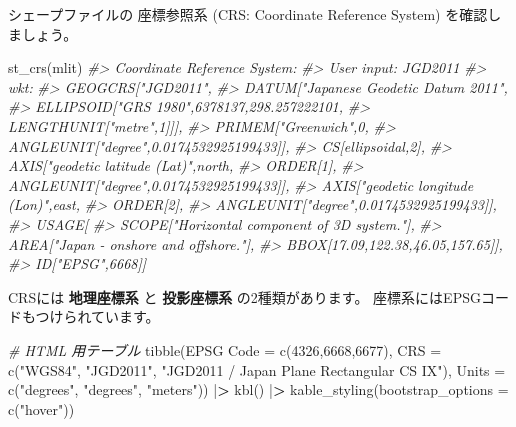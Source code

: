 \documentclass[
]{book}
\newenvironment{Shaded}{\begin{snugshade}}{\end{snugshade}}
\newcommand{\AttributeTok}[1]{\textcolor[rgb]{0.77,0.63,0.00}{#1}}
\newcommand{\CommentTok}[1]{\textcolor[rgb]{0.56,0.35,0.01}{\textit{#1}}}
\newcommand{\DecValTok}[1]{\textcolor[rgb]{0.00,0.00,0.81}{#1}}
\newcommand{\ErrorTok}[1]{\textcolor[rgb]{0.64,0.00,0.00}{\textbf{#1}}}
\newcommand{\FunctionTok}[1]{\textcolor[rgb]{0.00,0.00,0.00}{#1}}
\newcommand{\NormalTok}[1]{#1}
\newcommand{\OtherTok}[1]{\textcolor[rgb]{0.56,0.35,0.01}{#1}}
\newcommand{\SpecialCharTok}[1]{\textcolor[rgb]{0.00,0.00,0.00}{#1}}
\newcommand{\StringTok}[1]{\textcolor[rgb]{0.31,0.60,0.02}{#1}}
\theoremstyle{definition}
\theoremstyle{definition}
\theoremstyle{definition}
\theoremstyle{definition}
\theoremstyle{remark}
\begin{document}
シェープファイルの 座標参照系 (CRS: Coordinate Reference System) を確認しましょう。

\begin{Shaded}
\begin{Highlighting}[]
\FunctionTok{st\_crs}\NormalTok{(mlit)}
\CommentTok{\#\textgreater{} Coordinate Reference System:}
\CommentTok{\#\textgreater{}   User input: JGD2011 }
\CommentTok{\#\textgreater{}   wkt:}
\CommentTok{\#\textgreater{} GEOGCRS["JGD2011",}
\CommentTok{\#\textgreater{}     DATUM["Japanese Geodetic Datum 2011",}
\CommentTok{\#\textgreater{}         ELLIPSOID["GRS 1980",6378137,298.257222101,}
\CommentTok{\#\textgreater{}             LENGTHUNIT["metre",1]]],}
\CommentTok{\#\textgreater{}     PRIMEM["Greenwich",0,}
\CommentTok{\#\textgreater{}         ANGLEUNIT["degree",0.0174532925199433]],}
\CommentTok{\#\textgreater{}     CS[ellipsoidal,2],}
\CommentTok{\#\textgreater{}         AXIS["geodetic latitude (Lat)",north,}
\CommentTok{\#\textgreater{}             ORDER[1],}
\CommentTok{\#\textgreater{}             ANGLEUNIT["degree",0.0174532925199433]],}
\CommentTok{\#\textgreater{}         AXIS["geodetic longitude (Lon)",east,}
\CommentTok{\#\textgreater{}             ORDER[2],}
\CommentTok{\#\textgreater{}             ANGLEUNIT["degree",0.0174532925199433]],}
\CommentTok{\#\textgreater{}     USAGE[}
\CommentTok{\#\textgreater{}         SCOPE["Horizontal component of 3D system."],}
\CommentTok{\#\textgreater{}         AREA["Japan {-} onshore and offshore."],}
\CommentTok{\#\textgreater{}         BBOX[17.09,122.38,46.05,157.65]],}
\CommentTok{\#\textgreater{}     ID["EPSG",6668]]}
\end{Highlighting}
\end{Shaded}

CRSには \textbf{地理座標系} と \textbf{投影座標系} の2種類があります。
座標系にはEPSGコードもつけられています。

\begin{Shaded}
\begin{Highlighting}[]
\CommentTok{\# HTML 用テーブル}
\FunctionTok{tibble}\NormalTok{(}\StringTok{\textasciigrave{}}\AttributeTok{EPSG Code}\StringTok{\textasciigrave{}} \OtherTok{=} \FunctionTok{c}\NormalTok{(}\DecValTok{4326}\NormalTok{,}\DecValTok{6668}\NormalTok{,}\DecValTok{6677}\NormalTok{),}
       \StringTok{\textasciigrave{}}\AttributeTok{CRS}\StringTok{\textasciigrave{}} \OtherTok{=} \FunctionTok{c}\NormalTok{(}\StringTok{"WGS84"}\NormalTok{, }\StringTok{"JGD2011"}\NormalTok{, }\StringTok{"JGD2011 / Japan Plane Rectangular CS IX"}\NormalTok{),}
       \StringTok{\textasciigrave{}}\AttributeTok{Units}\StringTok{\textasciigrave{}} \OtherTok{=} \FunctionTok{c}\NormalTok{(}\StringTok{"degrees"}\NormalTok{, }\StringTok{"degrees"}\NormalTok{, }\StringTok{"meters"}\NormalTok{)) }\SpecialCharTok{|}\ErrorTok{\textgreater{}} 
  \FunctionTok{kbl}\NormalTok{() }\SpecialCharTok{|}\ErrorTok{\textgreater{}} 
  \FunctionTok{kable\_styling}\NormalTok{(}\AttributeTok{bootstrap\_options =} \FunctionTok{c}\NormalTok{(}\StringTok{"hover"}\NormalTok{))}
\end{Highlighting}
\end{Shaded}
\end{document}
